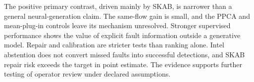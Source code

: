 The positive primary contrast, driven mainly by SKAB, is narrower than a general neural-generation claim. The same-flow gain is small, and the PPCA and mean-plug-in controls leave its mechanism unresolved. Stronger supervised performance shows the value of explicit fault information outside a generative model. Repair and calibration are stricter tests than ranking alone. Intel abstention does not convert missed faults into successful detections, and SKAB repair risk exceeds the target in point estimate. The evidence supports further testing of operator review under declared assumptions.
